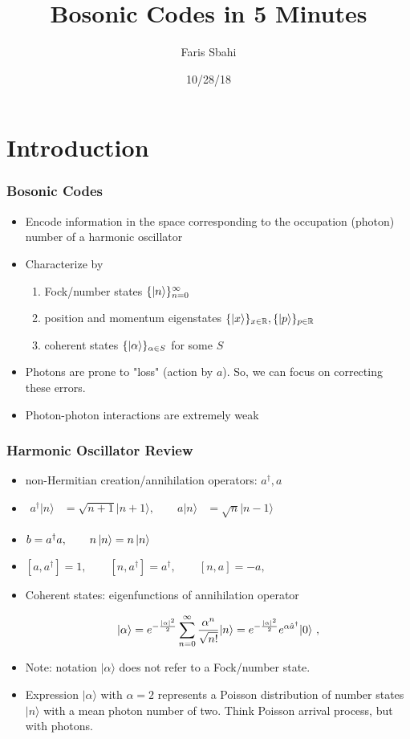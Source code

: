 \documentclass{beamer}
\title{Bosonic Codes in 5 Minutes}
\author[Sbahi] %
{Faris Sbahi}
\date{10/28/18}
\newcommand\0{\mathbf{0}}
\newcommand\RR{\mathbb{R}}
\begin{document}
\maketitle

\section{Introduction}

\begin{frame}
\frametitle{Bosonic Codes}
\begin{itemize}
\item Encode information in the space corresponding to the occupation (photon) number of a harmonic oscillator
\item Characterize by
\begin{enumerate}
\item Fock/number states $\{\ket{n}\}^\infty_{n=0}$
\item position and momentum eigenstates $\{\ket{x}\}_{x\in\RR}, \{\ket{p}\}_{p\in\RR}$
\item coherent states $\{\ket{\alpha}\}_{\alpha\in S}$ for some $S$
\end{enumerate}
\item Photons are prone to "loss" (action by $a$). So, we can focus on correcting these errors.
\item Photon-photon interactions are extremely weak
\end{itemize}
\end{frame}

\begin{frame}
\frametitle{Harmonic Oscillator Review}
\begin{itemize}
\item non-Hermitian creation/annihilation operators: $a^\dag, a$
\item ${{\begin{aligned}a^{\dagger }|n\rangle &={\sqrt {n+1}}|n+1\rangle, \qquad a|n\rangle &={\sqrt {n}}|n-1\rangle\end{aligned}}}$
\item $b = a^{\dag }a, \qquad n\ket{n} = n\ket{n} $
\item $[a,a^{\dag }]=1,\qquad [n,a^{\dag }]=a^{\dag },\qquad [n,a]=-a,$
\pause
\item Coherent states: eigenfunctions of annihilation operator 

$$
|\alpha\rangle =e^{-{|\alpha|^2\over2}}\sum_{n=0}^{\infty}{\alpha^n\over\sqrt{n!}}|n\rangle =e^{-{|\alpha|^2\over2}}e^{\alpha\hat a^\dagger}|0\rangle ~,
$$

\item Note: notation ${\displaystyle |\alpha \rangle }$  does not refer to a Fock/number state.

\item Expression ${\displaystyle |\alpha \rangle } $  with $\alpha = 2$ represents a Poisson distribution of number states ${\displaystyle |n\rangle }$  with a mean photon number of two. Think Poisson arrival process, but with photons.
\end{itemize}
\end{frame}
\end{document}
